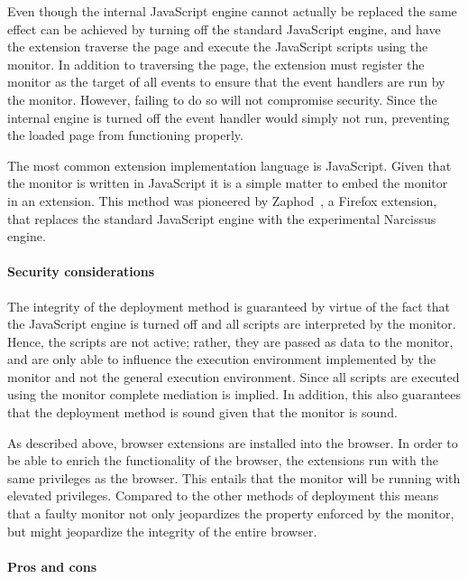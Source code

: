 \documentclass{llncs}
\begin{document}
Even though the internal JavaScript engine cannot actually be replaced the same
effect can be achieved by turning off the standard JavaScript engine, and have
the extension traverse the page and execute the JavaScript scripts
using the monitor. 
In addition to traversing the page, the extension must register the monitor as the target of
all events to ensure that the event handlers are run by the monitor. However, failing to
do so will not compromise security. Since the internal engine is turned off
the event handler would simply not run, preventing the loaded page from functioning
properly.

The most common extension implementation language is JavaScript. Given that
the monitor is written in JavaScript it is a simple matter to embed the 
monitor in an extension.
This method was pioneered by Zaphod~\cite{Zaphod}, a
Firefox extension, that replaces the standard JavaScript engine with the
experimental Narcissus~\cite{Narcissus} engine.

\vspace{-.4cm}
\paragraph{Security considerations}

The integrity of the deployment method is guaranteed by virtue of the fact that the
JavaScript engine is turned off and all scripts are interpreted by the monitor.
Hence, the scripts are not active; rather, they are passed as data to the
monitor, and are only able to influence the execution environment implemented
by the monitor and not the general execution environment.
Since all scripts are executed using the monitor complete mediation is implied.
In addition, this also guarantees that the deployment method is sound given that
the monitor is sound. 

As described above, browser extensions are installed into the browser. In order
to be able to enrich the functionality of the browser, the extensions run with
the same privileges as the browser. This entails that the monitor will be
running with elevated privileges. Compared to the other methods of deployment
this means that a faulty monitor not only jeopardizes the property enforced by
the monitor, but might jeopardize the integrity of the entire browser.

\vspace{-.4cm}
\paragraph{Pros and cons}
\end{document}
